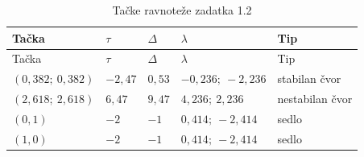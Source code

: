 \documentclass[11pt,a4paper,parskip=half,headsepline,numbers=noenddot]{scrartcl}
\begin{document}
\begin{longtable}[]{@{}
  >{\raggedright\arraybackslash}p{}
  >{\centering\arraybackslash}p{}
  >{\centering\arraybackslash}p{}
  >{\centering\arraybackslash}p{}
  >{\raggedright\arraybackslash}p{}@{}}
\caption{Tačke ravnoteže zadatka 1.2}\tabularnewline
\toprule\noalign{}
\begin{minipage}[b]{\linewidth}\raggedright
Tačka
\end{minipage} & \begin{minipage}[b]{\linewidth}\centering
\(\tau\)
\end{minipage} & \begin{minipage}[b]{\linewidth}\centering
\(\Delta\)
\end{minipage} & \begin{minipage}[b]{\linewidth}\centering
\(\lambda\)
\end{minipage} & \begin{minipage}[b]{\linewidth}\raggedright
Tip
\end{minipage} \\
\midrule\noalign{}
\endfirsthead
\toprule\noalign{}
\begin{minipage}[b]{\linewidth}\raggedright
Tačka
\end{minipage} & \begin{minipage}[b]{\linewidth}\centering
\(\tau\)
\end{minipage} & \begin{minipage}[b]{\linewidth}\centering
\(\Delta\)
\end{minipage} & \begin{minipage}[b]{\linewidth}\centering
\(\lambda\)
\end{minipage} & \begin{minipage}[b]{\linewidth}\raggedright
Tip
\end{minipage} \\
\midrule\noalign{}
\endhead
\bottomrule\noalign{}
\endlastfoot
\((0{,}382;\ 0{,}382)\) & \(-2{,}47\) & \(0{,}53\) & \(-0{,}236;\ -2{,}236\) & stabilan čvor \\
\((2{,}618;\ 2{,}618)\) & \(6{,}47\) & \(9{,}47\) & \(4{,}236;\ 2{,}236\) & nestabilan čvor \\
\((0, 1)\) & \(-2\) & \(-1\) & \(0{,}414;\ -2{,}414\) & sedlo \\
\((1, 0)\) & \(-2\) & \(-1\) & \(0{,}414;\ -2{,}414\) & sedlo \\
\end{longtable}
\end{document}
